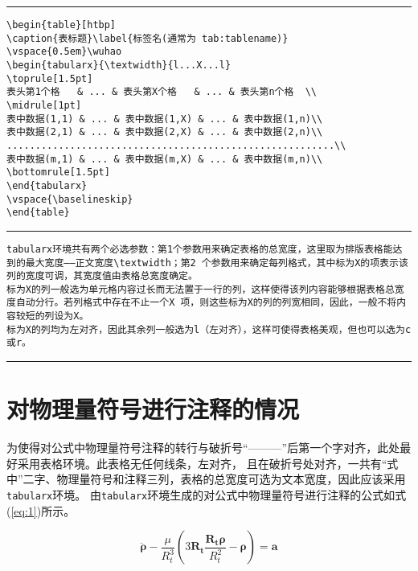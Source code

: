 \vspace{1em}\noindent\hrule
\begin{verbatim}
\begin{table}[htbp]
\caption{表标题}\label{标签名(通常为 tab:tablename)}
\vspace{0.5em}\wuhao
\begin{tabularx}{\textwidth}{l...X...l}
\toprule[1.5pt]
表头第1个格   & ... & 表头第X个格   & ... & 表头第n个格  \\
\midrule[1pt]
表中数据(1,1) & ... & 表中数据(1,X) & ... & 表中数据(1,n)\\
表中数据(2,1) & ... & 表中数据(2,X) & ... & 表中数据(2,n)\\
.........................................................\\
表中数据(m,1) & ... & 表中数据(m,X) & ... & 表中数据(m,n)\\
\bottomrule[1.5pt]
\end{tabularx}
\vspace{\baselineskip}
\end{table}
\end{verbatim}

\noindent\hrule
\begin{verbatim}
tabularx环境共有两个必选参数：第1个参数用来确定表格的总宽度，这里取为排版表格能达到的最大宽度——正文宽度\textwidth；第2 个参数用来确定每列格式，其中标为X的项表示该列的宽度可调，其宽度值由表格总宽度确定。
标为X的列一般选为单元格内容过长而无法置于一行的列，这样使得该列内容能够根据表格总宽度自动分行。若列格式中存在不止一个X 项，则这些标为X的列的列宽相同，因此，一般不将内容较短的列设为X。
标为X的列均为左对齐，因此其余列一般选为l（左对齐），这样可使得表格美观，但也可以选为c或r。
\end{verbatim}

\noindent\hrule
\section{对物理量符号进行注释的情况}
为使得对公式中物理量符号注释的转行与破折号“———”后第一个字对齐，此处最好采用表格环境。此表格无任何线条，左对齐，
且在破折号处对齐，一共有“式中”二字、物理量符号和注释三列，表格的总宽度可选为文本宽度，因此应该采用\verb|tabularx|环境。
由\verb|tabularx|环境生成的对公式中物理量符号进行注释的公式如式(\ref{eq:1})所示。

\begin{equation}\label{eq:1}
\ddot{\boldsymbol{\rho}}-\frac{\mu}{R_{t}^{3}}\left(3\mathbf{R_{t}}\frac{\mathbf{R_{t}\rho}}{R_{t}^{2}}-\boldsymbol{\rho}\right)=\mathbf{a}
\end{equation}

